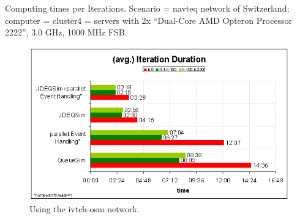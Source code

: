 Computing times per Iterations.  Scenario = navteq network of Switzerland; computer = cluster4 = servers with 2x ``Dual-Core AMD Opteron Processor 2222'', 3.0 GHz, 1000 MHz FSB.
\begin{figure}[h]
\centering
\includegraphics[width=0.75\linewidth]{figures/benchmarks/jdeqsimtime}
\caption{Using the ivtch-osm network.}
\label{fig:JdeqsimTime-navteq}
\end{figure}

